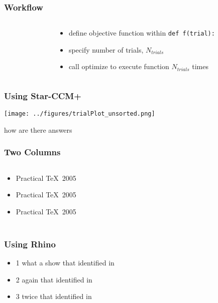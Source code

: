 \documentclass[ignorenonframetext,]{beamer}
\begin{document}
\begin{frame}
  \frametitle{Workflow}
  \begin{columns}[t]
    \begin{column}{0.7\textwidth}
    \end{column}
    \begin{column}{0.5\textwidth}
      \begin{itemize}
        \item define objective function within \texttt{def f(trial):}
      \item specify number of trials, $N_{trials}$
      \item call optimize to execute function $N_{trials}$ times
      \end{itemize}
    \end{column}
  \end{columns}
\end{frame}

\begin{frame}[fragile,t]
  \frametitle{Using Star-CCM+}
    \begin{center}
      \texttt{[image: ../figures/trialPlot\_unsorted.png]}
    \end{center}
    how are there answers
\end{frame}

\begin{frame}
  \frametitle{Two Columns}
  \begin{columns}[c]
    \begin{column}{1.5in}
      \begin{itemize}
        \item Practical \TeX\ 2005\\
        \item Practical \TeX\ 2005\\
        \item Practical \TeX\ 2005
      \end{itemize}
    \end{column}
    \begin{column}{3.0in}
    \end{column}
  \end{columns}
\end{frame}

\subsection{}
\begin{frame}
  \frametitle{Using Rhino}
  \begin{itemize}
    \itemsep1pt\parskip0pt
    \item 1 what a show that identified in
    \item 2 again that identified in
    \item 3 twice that identified in
  \end{itemize}
\end{frame}
\end{document}
